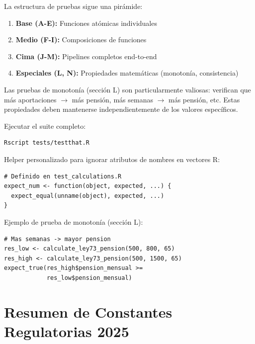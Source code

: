 \documentclass[11pt,a4paper]{report}
\theoremstyle{remark}
\begin{document}
\begin{tcolorbox}[colback=green!5!white, colframe=green!50!black, title=\textbf{Intuici\'on}]
La estructura de pruebas sigue una pir\'amide:
\begin{enumerate}
  \item \textbf{Base (A-E):} Funciones at\'omicas individuales
  \item \textbf{Medio (F-I):} Composiciones de funciones
  \item \textbf{Cima (J-M):} Pipelines completos end-to-end
  \item \textbf{Especiales (L, N):} Propiedades matem\'aticas (monoton\'ia, consistencia)
\end{enumerate}

Las pruebas de monoton\'ia (secci\'on L) son particularmente valiosas: verifican que m\'as aportaciones $\to$ m\'as pensi\'on, m\'as semanas $\to$ m\'as pensi\'on, etc. Estas propiedades deben mantenerse independientemente de los valores espec\'ificos.
\end{tcolorbox}

\begin{tcolorbox}[colback=orange!5!white, colframe=orange!75!black, title=\textbf{Aplicaci\'on en C\'odigo}]
Ejecutar el suite completo:
\begin{lstlisting}
Rscript tests/testthat.R
\end{lstlisting}

Helper personalizado para ignorar atributos de nombres en vectores R:
\begin{lstlisting}
# Definido en test_calculations.R
expect_num <- function(object, expected, ...) {
  expect_equal(unname(object), expected, ...)
}
\end{lstlisting}

Ejemplo de prueba de monoton\'ia (secci\'on L):
\begin{lstlisting}
# Mas semanas -> mayor pension
res_low <- calculate_ley73_pension(500, 800, 65)
res_high <- calculate_ley73_pension(500, 1500, 65)
expect_true(res_high$pension_mensual >=
            res_low$pension_mensual)
\end{lstlisting}
\end{tcolorbox}

\section{Resumen de Constantes Regulatorias 2025}
\end{document}
